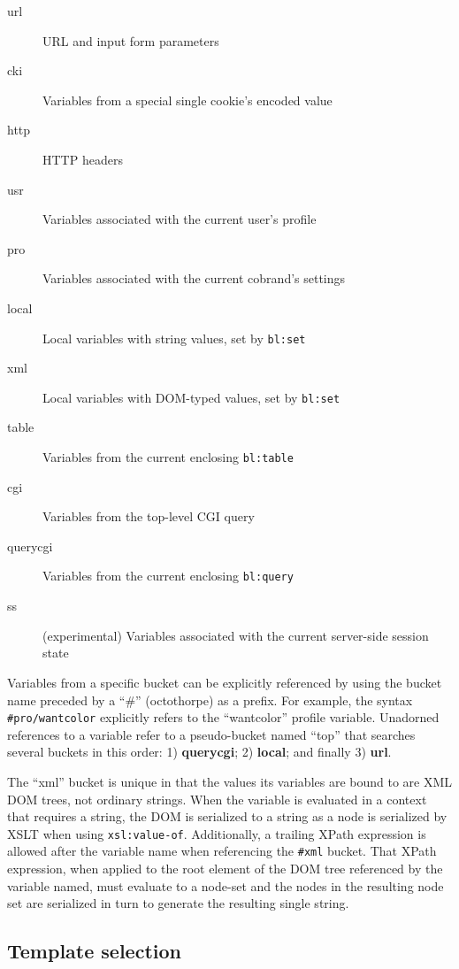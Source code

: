 \documentclass{www2003-submission}
\newcommand{\smtexttt}[1]{{\small\texttt{#1}}}
\begin{document}
\begin{description}
\item[url] URL and input form parameters
\item[cki] Variables from a special single cookie's encoded value
\item[http] HTTP headers
\item[usr] Variables associated with the current user's profile
\item[pro] Variables associated with the current cobrand's settings
\item[local] Local variables with string values, set by \smtexttt{bl:set}
\item[xml] Local variables with DOM-typed values, set by \smtexttt{bl:set}
\item[table] Variables from the current enclosing \smtexttt{bl:table}
\item[cgi] Variables from the top-level CGI query
\item[querycgi] Variables from the current enclosing \smtexttt{bl:query}
\item[ss] (experimental) Variables associated with the current server-side session
      state
\end{description}

\noindent Variables from a specific bucket can be explicitly referenced
by using the bucket name preceded by a ``\#'' (octothorpe) as a prefix.
For example, the syntax \smtexttt{\#pro/wantcolor} explicitly refers to
the ``wantcolor'' profile variable. Unadorned references to a variable
refer to a pseudo-bucket named ``top'' that searches several buckets in
this order: 1) \textbf{querycgi}; 2) \textbf{local}; and finally 3)
\textbf{url}.

The ``xml'' bucket is unique in that the values its variables are bound
to are XML DOM trees, not ordinary strings.  When the variable is
evaluated in a context that requires a string, the DOM is serialized to
a string as a node is serialized by XSLT when using
\smtexttt{xsl:value-of}.  Additionally, a trailing XPath expression is
allowed after the variable name when referencing the \smtexttt{\#xml}
bucket.  That XPath expression, when applied to the root element of the
DOM tree referenced by the variable named, must evaluate to a node-set
and the nodes in the resulting node set are serialized in turn to
generate the resulting single string.


\subsection{Template selection}
\end{document}
